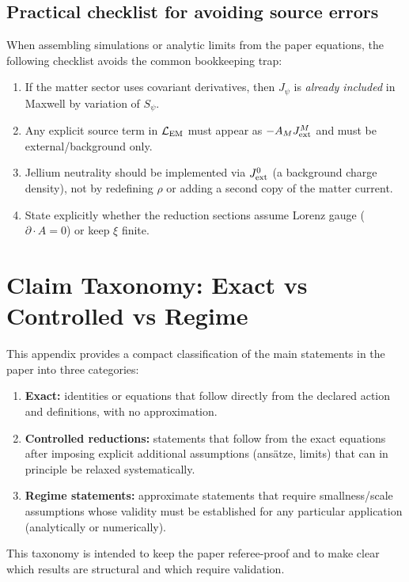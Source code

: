 \documentclass[11pt]{article}
\begin{document}
\subsection{Practical checklist for avoiding source errors}
\label{app:gauge-checklist}

When assembling simulations or analytic limits from the paper equations, the following checklist avoids the common bookkeeping trap:
\begin{enumerate}[leftmargin=2.2em]
\item If the matter sector uses covariant derivatives, then $J_\psi$ is \emph{already included} in Maxwell by variation of $S_\psi$.
\item Any explicit source term in $\mathcal L_{\rm EM}$ must appear as $-A_M J_{\rm ext}^M$ and must be external/background only.
\item Jellium neutrality should be implemented via $J_{\rm ext}^0$ (a background charge density), not by redefining $\rho$ or adding a second copy of the matter current.
\item State explicitly whether the reduction sections assume Lorenz gauge ($\partial\!\cdot\!A=0$) or keep $\xi$ finite.
\end{enumerate}

\section{Claim Taxonomy: Exact vs Controlled vs Regime}
\label{app:claims}

This appendix provides a compact classification of the main statements in the paper into three categories:
\begin{enumerate}[leftmargin=2.2em]
\item \textbf{Exact:} identities or equations that follow directly from the declared action and definitions, with no approximation.
\item \textbf{Controlled reductions:} statements that follow from the exact equations after imposing explicit additional assumptions (ans\"atze, limits) that can in principle be relaxed systematically.
\item \textbf{Regime statements:} approximate statements that require smallness/scale assumptions whose validity must be established for any particular application (analytically or numerically).
\end{enumerate}
This taxonomy is intended to keep the paper referee-proof and to make clear which results are structural and which require validation.
\end{document}
